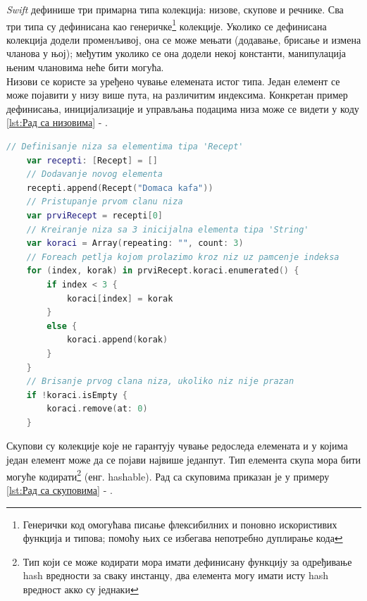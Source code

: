 \documentclass[12pt,oneside]{memoir}
\begin{document}
\indent \textit{Swift} дефинише три примарна типа колекција: низове, скупове и речнике. Сва три типа су дефинисана као генеричке\footnote{Генерички код омогућава писање флексибилних и поновно искористивих функција и типова; помоћу њих се избегава непотребно дуплирање кода} колекције. Уколико се дефинисана колекција додели променљивој, она се може мењати (додавање, брисање и измена чланова у њој); међутим уколико се она додели некој константи, манипулација њеним члановима неће бити могућа. \\
\indent Низови се користе за уређено чување елемената истог типа. Један елемент се може појавити у низу више пута, на различитим индексима. Конкретан пример дефинисања, иницијализације и управљања подацима низа може се видети у коду \ref{lst:Рад са низовима} - .

\begin{lstlisting}[caption=\textit{{Рад са низовима}}, label={lst:Рад са низовима}, language=Swift, frame=single]
    // Definisanje niza sa elementima tipa 'Recept'
    var recepti: [Recept] = []
    // Dodavanje novog elementa
    recepti.append(Recept("Domaca kafa"))
    // Pristupanje prvom clanu niza
    var prviRecept = recepti[0]
    // Kreiranje niza sa 3 inicijalna elementa tipa 'String'
    var koraci = Array(repeating: "", count: 3)
    // Foreach petlja kojom prolazimo kroz niz uz pamcenje indeksa
    for (index, korak) in prviRecept.koraci.enumerated() {
        if index < 3 {
            koraci[index] = korak
        }
        else {
            koraci.append(korak)
        }
    }
    // Brisanje prvog clana niza, ukoliko niz nije prazan
    if !koraci.isEmpty {
        koraci.remove(at: 0)
    }
\end{lstlisting}

\indent Скупови су колекције које не гарантују чување редоследа елемената и у којима један елемент може да се појави највише једанпут. Тип елемента скупа мора бити могуће кодирати\footnote{Тип који се може кодирати мора имати дефинисану функцију за одређивање hash вредности за сваку инстанцу, два елемента могу имати исту hash вредност акко су једнаки} (енг. hashable). Рад са скуповима приказан је у примеру \ref{lst:Рад са скуповима} - .
\end{document}
